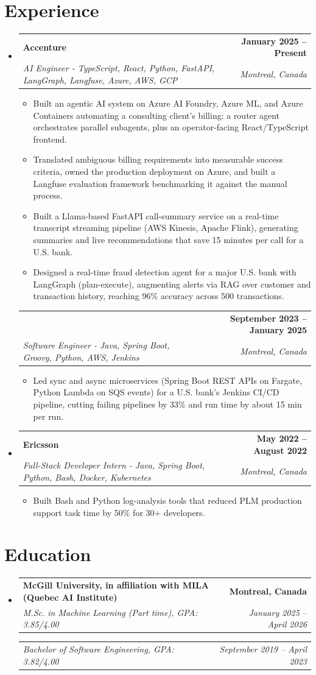 \documentclass[letterpaper,11pt]{article}
\makeatletter
\newcommand{\resumeItem}[1]{
  \item\small{{#1 \vspace{-2pt}}}
}
\newcommand{\resumeSubheading}[4]{
  \vspace{-2pt}\item
    \begin{tabularx}{1.0\textwidth}[t]{@{}>{\raggedright\arraybackslash}X@{\hspace{8pt}}r@{}}
      \textbf{#1} & \textbf{\small #2} \\
      \textit{\small#3} & \textit{\small #4} \\
    \end{tabularx}\vspace{-7pt}
}
\newcommand{\resumeSubheadingContinued}[3]{
  \vspace{4pt}
    \begin{tabularx}{1.0\textwidth}[t]{@{}>{\raggedright\arraybackslash}X@{\hspace{8pt}}r@{}}
      & \textbf{\small #2} \\
      \textit{\small#1} & \textit{\small #3} \\
    \end{tabularx}\vspace{-7pt}
}
\newcommand{\resumeSubheadingDegree}[2]{
  \vspace{2pt}
    \begin{tabular*}{1.0\textwidth}[t]{l@{\extracolsep{\fill}}r}
      \textit{\small#1} & \textit{\small #2} \\
    \end{tabular*}\vspace{-7pt}
}
\newcommand{\resumeSubHeadingListStart}{\begin{itemize}[leftmargin=0.0in, label={}]}
\newcommand{\resumeSubHeadingListEnd}{\end{itemize}}
\newcommand{\resumeItemListStart}{\begin{itemize}}
\newcommand{\resumeItemListEnd}{\end{itemize}\vspace{-5pt}}
\makeatother
\begin{document}
\section{Experience}
  \resumeSubHeadingListStart

    \resumeSubheading
      {Accenture}{January 2025 -- Present}
      {AI Engineer - TypeScript, React, Python, FastAPI, LangGraph, Langfuse, Azure, AWS, GCP}{Montreal, Canada}
      \resumeItemListStart
        \resumeItem{Built an agentic AI system on Azure AI Foundry, Azure ML, and Azure Containers automating a consulting client's billing: a router agent orchestrates parallel subagents, plus an operator-facing React/TypeScript frontend.}
        \resumeItem{Translated ambiguous billing requirements into measurable success criteria, owned the production deployment on Azure, and built a Langfuse evaluation framework benchmarking it against the manual process.}
        \resumeItem{Built a Llama-based FastAPI call-summary service on a real-time transcript streaming pipeline (AWS Kinesis, Apache Flink), generating summaries and live recommendations that save 15 minutes per call for a U.S. bank.}
        \resumeItem{Designed a real-time fraud detection agent for a major U.S. bank with LangGraph (plan-execute), augmenting alerts via RAG over customer and transaction history, reaching 96\% accuracy across 500 transactions.}
      \resumeItemListEnd
      \vspace{-8pt}

    \resumeSubheadingContinued
      {Software Engineer - Java, Spring Boot, Groovy, Python, AWS, Jenkins}{September 2023 -- January 2025}{Montreal, Canada}
      \resumeItemListStart
        \resumeItem{Led sync and async microservices (Spring Boot REST APIs on Fargate, Python Lambda on SQS events) for a U.S. bank's Jenkins CI/CD pipeline, cutting failing pipelines by 33\% and run time by about 15 min per run.}
      \resumeItemListEnd

    \resumeSubheading
      {Ericsson}{May 2022 -- August 2022}
      {Full-Stack Developer Intern - Java, Spring Boot, Python, Bash, Docker, Kubernetes}{Montreal, Canada}
      \resumeItemListStart
        \resumeItem{Built Bash and Python log-analysis tools that reduced PLM production support task time by 50\% for 30+ developers.}
      \resumeItemListEnd

  \resumeSubHeadingListEnd
\vspace{-14pt}

\section{Education}
  \resumeSubHeadingListStart
    \resumeSubheading
      {McGill University, in affiliation with MILA (Quebec AI Institute)}{Montreal, Canada}
      {M.Sc. in Machine Learning (Part time), GPA: 3.85/4.00}{January 2025 -- April 2026}
    \vspace{1pt}
    \resumeSubheadingDegree{Bachelor of Software Engineering, GPA: 3.82/4.00}{September 2019 -- April 2023}
  \resumeSubHeadingListEnd
\vspace{-12pt}
\end{document}

